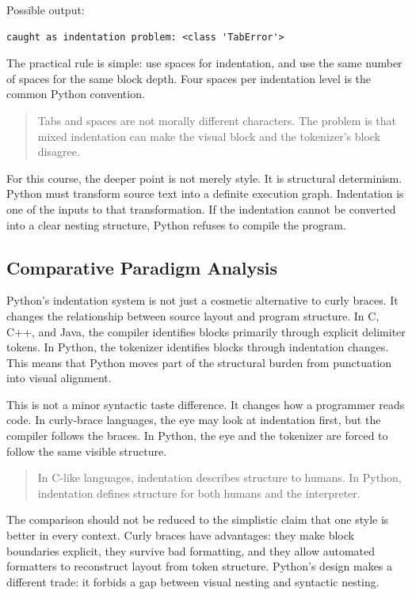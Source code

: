 \documentclass[a4paper,twoside]{report}
\begin{document}
Possible output:

\begin{verbatim}
caught as indentation problem: <class 'TabError'>
\end{verbatim}

The practical rule is simple: use spaces for indentation, and use the same number of spaces for the same block depth. Four spaces per indentation level is the common Python convention.

\begin{quote}
Tabs and spaces are not morally different characters. The problem is that mixed indentation can make the visual block and the tokenizer's block disagree.
\end{quote}

For this course, the deeper point is not merely style. It is structural determinism. Python must transform source text into a definite execution graph. Indentation is one of the inputs to that transformation. If the indentation cannot be converted into a clear nesting structure, Python refuses to compile the program.

\subsection{Comparative Paradigm Analysis}

Python's indentation system is not just a cosmetic alternative to curly braces. It changes the relationship between source layout and program structure. In C, C++, and Java, the compiler identifies blocks primarily through explicit delimiter tokens. In Python, the tokenizer identifies blocks through indentation changes. This means that Python moves part of the structural burden from punctuation into visual alignment.

This is not a minor syntactic taste difference. It changes how a programmer reads code. In curly-brace languages, the eye may look at indentation first, but the compiler follows the braces. In Python, the eye and the tokenizer are forced to follow the same visible structure.

\begin{quote}
In C-like languages, indentation describes structure to humans. In Python, indentation defines structure for both humans and the interpreter.
\end{quote}

The comparison should not be reduced to the simplistic claim that one style is better in every context. Curly braces have advantages: they make block boundaries explicit, they survive bad formatting, and they allow automated formatters to reconstruct layout from token structure. Python's design makes a different trade: it forbids a gap between visual nesting and syntactic nesting.
\end{document}
